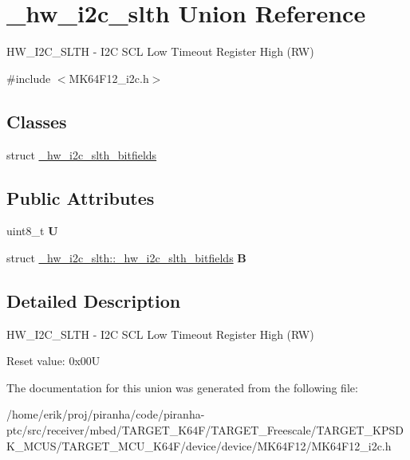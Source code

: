 \hypertarget{union__hw__i2c__slth}{}\section{\+\_\+hw\+\_\+i2c\+\_\+slth Union Reference}
\label{union__hw__i2c__slth}


H\+W\+\_\+\+I2\+C\+\_\+\+S\+L\+TH -\/ I2C S\+CL Low Timeout Register High (RW)  




{\ttfamily \#include $<$M\+K64\+F12\+\_\+i2c.\+h$>$}

\subsection*{Classes}
\begin{DoxyCompactItemize}
\item 
struct \hyperlink{struct__hw__i2c__slth_1_1__hw__i2c__slth__bitfields}{\+\_\+hw\+\_\+i2c\+\_\+slth\+\_\+bitfields}
\end{DoxyCompactItemize}
\subsection*{Public Attributes}
\begin{DoxyCompactItemize}
\item 
uint8\+\_\+t {\bfseries U}\hypertarget{union__hw__i2c__slth_afa09749a12268c5b3ae10015d54983e5}{}\label{union__hw__i2c__slth_afa09749a12268c5b3ae10015d54983e5}

\item 
struct \hyperlink{struct__hw__i2c__slth_1_1__hw__i2c__slth__bitfields}{\+\_\+hw\+\_\+i2c\+\_\+slth\+::\+\_\+hw\+\_\+i2c\+\_\+slth\+\_\+bitfields} {\bfseries B}\hypertarget{union__hw__i2c__slth_a27011acaff98b3dbdb36ee67eec0a1d6}{}\label{union__hw__i2c__slth_a27011acaff98b3dbdb36ee67eec0a1d6}

\end{DoxyCompactItemize}


\subsection{Detailed Description}
H\+W\+\_\+\+I2\+C\+\_\+\+S\+L\+TH -\/ I2C S\+CL Low Timeout Register High (RW) 

Reset value\+: 0x00U 

The documentation for this union was generated from the following file\+:\begin{DoxyCompactItemize}
\item 
/home/erik/proj/piranha/code/piranha-\/ptc/src/receiver/mbed/\+T\+A\+R\+G\+E\+T\+\_\+\+K64\+F/\+T\+A\+R\+G\+E\+T\+\_\+\+Freescale/\+T\+A\+R\+G\+E\+T\+\_\+\+K\+P\+S\+D\+K\+\_\+\+M\+C\+U\+S/\+T\+A\+R\+G\+E\+T\+\_\+\+M\+C\+U\+\_\+\+K64\+F/device/device/\+M\+K64\+F12/M\+K64\+F12\+\_\+i2c.\+h\end{DoxyCompactItemize}
